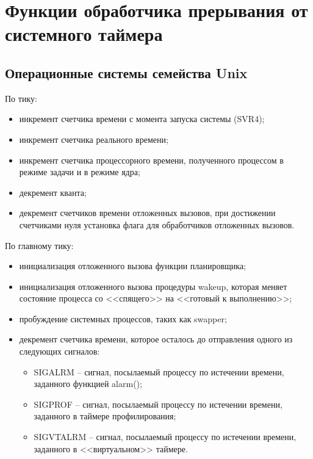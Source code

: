 \setcounter{page}{2}

\chapter{Функции обработчика прерывания от системного таймера}

\section{Операционные системы семейства Unix}

По тику:

\begin{itemize}
	\item инкремент счетчика времени с момента запуска системы (SVR4);
	\item инкремент счетчика реального времени;
        \item инкремент счетчика процессорного времени, полученного процессом в режиме задачи и в режиме ядра;
	\item декремент кванта;
	\item декремент счетчиков времени отложенных вызовов, при достижении счетчиками нуля установка флага для обработчиков отложенных вызовов.
\end{itemize}

По главному тику:

\begin{itemize}
	\item инициализация отложенного вызова функции планировщика;
	\item инициализация отложенного вызова процедуры wakeup, которая меняет состояние процесса со <<спящего>> на <<готовый к выполнению>>;
	\item пробуждение системных процессов, таких как swapper;
	\item декремент счетчика времени, которое осталось до отправления одного из следующих сигналов:
	\begin{itemize}
		\item SIGALRM – сигнал, посылаемый процессу по истечении времени, заданного функцией alarm();
		\item SIGPROF –  сигнал, посылаемый процессу по истечении времени, заданного в таймере профилирования;
		\item SIGVTALRM –  сигнал, посылаемый процессу по истечении времени, заданного в <<виртуальном>> таймере.
	\end{itemize}
\end{itemize}

